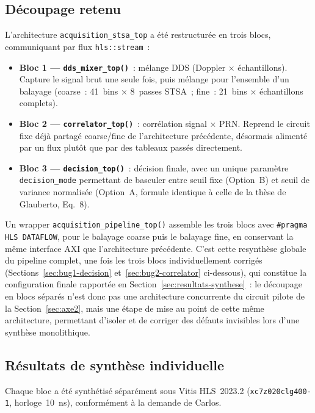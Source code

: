 \documentclass[11pt,a4paper]{article}
\begin{document}
\subsection{Découpage retenu}

L'architecture \texttt{acquisition\_stsa\_top} a été restructurée en trois blocs, communiquant par flux \texttt{hls::stream}~:

\begin{itemize}
  \item \textbf{Bloc 1 --- \texttt{dds\_mixer\_top()}}~: mélange DDS (Doppler × échantillons). Capture le signal brut une seule fois, puis mélange pour l'ensemble d'un balayage (coarse~: 41~bins × 8~passes STSA~; fine~: 21~bins × échantillons complets).
  \item \textbf{Bloc 2 --- \texttt{correlator\_top()}}~: corrélation signal × PRN. Reprend le circuit fixe déjà partagé coarse/fine de l'architecture précédente, désormais alimenté par un flux plutôt que par des tableaux passés directement.
  \item \textbf{Bloc 3 --- \texttt{decision\_top()}}~: décision finale, avec un unique paramètre \texttt{decision\_mode} permettant de basculer entre seuil fixe (Option~B) et seuil de variance normalisée (Option~A, formule identique à celle de la thèse de Glauberto, Eq.~8).
\end{itemize}

Un wrapper \texttt{acquisition\_pipeline\_top()} assemble les trois blocs avec \texttt{\#pragma HLS DATAFLOW}, pour le balayage coarse puis le balayage fine, en conservant la même interface AXI que l'architecture précédente. C'est cette resynthèse globale du pipeline complet, une fois les trois blocs individuellement corrigés (Sections~\ref{sec:bug1-decision} et~\ref{sec:bug2-correlator} ci-dessous), qui constitue la configuration finale rapportée en Section~\ref{sec:resultats-synthese}~: le découpage en blocs séparés n'est donc pas une architecture concurrente du circuit pilote de la Section~\ref{sec:axe2}, mais une étape de mise au point de cette même architecture, permettant d'isoler et de corriger des défauts invisibles lors d'une synthèse monolithique.

\subsection{Résultats de synthèse individuelle}

Chaque bloc a été synthétisé séparément sous Vitis HLS~2023.2 (\texttt{xc7z020clg400-1}, horloge~10~ns), conformément à la demande de Carlos.
\end{document}
